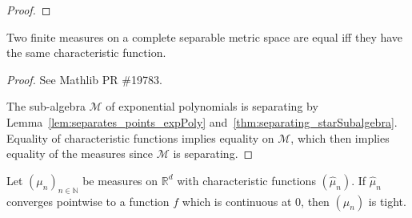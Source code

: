 \begin{proof}\leanok
\end{proof}


\begin{lemma}\label{lem:ext_charFun}
\leanok
{}
Two finite measures on a complete separable metric space are equal iff they have the same characteristic function.
\end{lemma}

\begin{proof}\leanok
See Mathlib PR \#19783.

The sub-algebra $\mathcal M$ of exponential polynomials is separating by Lemma~\ref{lem:separates_points_expPoly} and~\ref{thm:separating_starSubalgebra}. Equality of characteristic functions implies equality on $\mathcal M$, which then implies equality of the measures since $\mathcal M$ is separating.
\end{proof}






\begin{lemma}\label{lem:tight_of_tendsto_charFun}
\leanok
{}
Let $(\mu_n)_{n \in \mathbb{N}}$ be measures on $\mathbb{R}^d$ with characteristic functions $(\hat{\mu}_n)$. If $\hat{\mu}_n$ converges pointwise to a function $f$ which is continuous at 0, then $(\mu_n)$ is tight.
\end{lemma}

